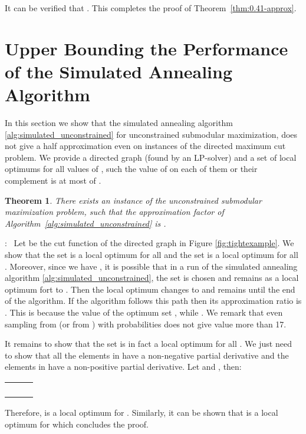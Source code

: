 \documentclass{article}[11pt]
\newtheorem{theorem}{Theorem}[section]
\renewenvironment{proof}{\noindent{\bf Proof}:~}{\\}
\begin{document}
It can be verified that .
This completes the proof of Theorem~\ref{thm:0.41-approx}.



\section{Upper Bounding the Performance of the Simulated Annealing Algorithm}
\label{app:tightexample}


In this section we show that the simulated annealing algorithm
\ref{alg:simulated_unconstrained} for unconstrained submodular maximization,
does not give a half approximation even on instances of the directed 
maximum cut problem. We provide a directed graph  (found by an LP-solver)
and a set of local optimums for all values of , such the value
of  on each of them or their complement is at most  of . 

\begin{theorem}
\label{thm:tightexample}
There exists an instance of the unconstrained submodular maximization problem,
such that the approximation factor of Algorithm~\ref{alg:simulated_unconstrained}
is .
\end{theorem}



\begin{proof}
Let  be the cut function of the directed graph  in Figure \ref{fig:tightexample}.
We show that the set  is a local optimum for all  and the set  is a local optimum for all .
Moreover, since we have , it is possible
that in a run of the simulated annealing algorithm \ref{alg:simulated_unconstrained},
the set  is chosen and remains as a local optimum fort  to .
Then the local optimum changes to  and remains until the end of the algorithm. 
If the algorithm follows this path then its approximation ratio
is . This is because the value of the optimum set
, while .
We remark that even sampling from  (or from )
with probabilities  does not give value more than 17.

It remains to show that the set  is in fact a local optimum for all
. We just need to show that all the elements
in  have a  non-negative partial derivative and the elements in 
have a non-positive partial derivative. Let 
and , then:

\begin{center}
\begin{tabular}{lcl}
 & &  \\
 & & \\
  & &  \\
   & &  
\end{tabular}
\end{center}

Therefore,  is a local optimum for .
Similarly, it can be shown that  is a local optimum for 
which concludes the proof.
\end{proof}
\end{document}
